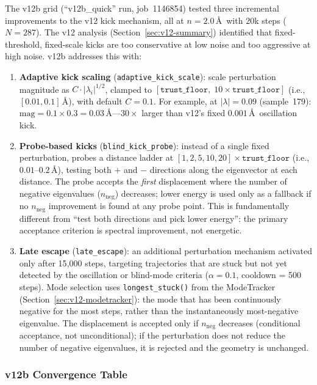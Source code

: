 \documentclass[11pt,a4paper]{article}
\theoremstyle{definition}
\begin{document}
The v12b grid (``v12b\_quick'' run, job~1146854) tested three incremental
improvements to the v12 kick mechanism, all at $n=2.0$\,\AA\ with 20k
steps ($N=287$).  The v12 analysis (Section~\ref{sec:v12-summary})
identified that fixed-threshold, fixed-scale kicks are too conservative
at low noise and too aggressive at high noise.  v12b addresses this with:
\begin{enumerate}[nosep]
  \item \textbf{Adaptive kick scaling} (\texttt{adaptive\_kick\_scale}):
    scale perturbation magnitude as $C \cdot |\lambda_i|^{1/2}$,
    clamped to $[\texttt{trust\_floor},\; 10 \times \texttt{trust\_floor}]$
    (i.e., $[0.01, 0.1]$\,\AA), with default $C=0.1$.
    For example, at $|\lambda|=0.09$ (sample~179):
    $\text{mag} = 0.1 \times 0.3 = 0.03$\,\AA---$30\times$ larger than
    v12's fixed $0.001$\,\AA\ oscillation kick.
  \item \textbf{Probe-based kicks} (\texttt{blind\_kick\_probe}):
    instead of a single fixed perturbation, probes a distance ladder
    at $[1, 2, 5, 10, 20] \times \texttt{trust\_floor}$
    (i.e., $0.01$--$0.2$\,\AA), testing both $+$ and $-$ directions
    along the eigenvector at each distance.  The probe accepts the
    \emph{first} displacement where the number of negative eigenvalues
    ($n_\text{neg}$) decreases; lower energy is used only as a
    fallback if no $n_\text{neg}$ improvement is found at any
    probe point.  This is fundamentally different from
    ``test both directions and pick lower energy'': the primary
    acceptance criterion is spectral improvement, not energetic.
  \item \textbf{Late escape} (\texttt{late\_escape}):
    an additional perturbation mechanism activated only after 15{,}000
    steps, targeting trajectories that are stuck but not yet detected
    by the oscillation or blind-mode criteria ($\alpha=0.1$,
    cooldown = 500 steps).  Mode selection uses
    \texttt{longest\_stuck()} from the ModeTracker
    (Section~\ref{sec:v12-modetracker}): the mode that has been
    continuously negative for the most steps, rather than the
    instantaneously most-negative eigenvalue.  The displacement is
    accepted only if $n_\text{neg}$ decreases (conditional acceptance,
    not unconditional); if the perturbation does not reduce the number
    of negative eigenvalues, it is rejected and the geometry is
    unchanged.
\end{enumerate}

\subsubsection{v12b Convergence Table}
\label{sec:v12b-table}
\end{document}
